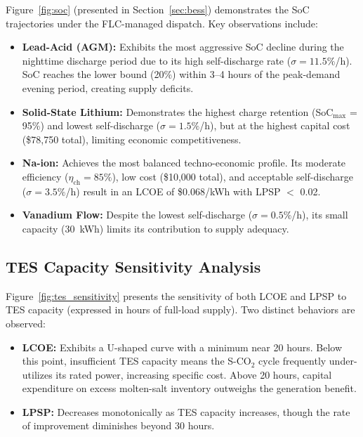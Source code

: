 \documentclass[journal]{IEEEtran}
\begin{document}
Figure~\ref{fig:soc} (presented in Section~\ref{sec:bess}) demonstrates the SoC trajectories under the FLC-managed dispatch. Key observations include:

\begin{itemize}
    \item \textbf{Lead-Acid (AGM):} Exhibits the most aggressive SoC decline during the nighttime discharge period due to its high self-discharge rate ($\sigma = 11.5\%$/h). SoC reaches the lower bound (20\%) within 3--4 hours of the peak-demand evening period, creating supply deficits.
    \item \textbf{Solid-State Lithium:} Demonstrates the highest charge retention (SoC$_{\max}$ = 95\%) and lowest self-discharge ($\sigma = 1.5\%$/h), but at the highest capital cost (\$78,750 total), limiting economic competitiveness.
    \item \textbf{Na-ion:} Achieves the most balanced techno-economic profile. Its moderate efficiency ($\eta_{\text{ch}} = 85\%$), low cost (\$10,000 total), and acceptable self-discharge ($\sigma = 3.5\%$/h) result in an LCOE of \$0.068/kWh with LPSP $<$ 0.02.
    \item \textbf{Vanadium Flow:} Despite the lowest self-discharge ($\sigma = 0.5\%$/h), its small capacity (30~kWh) limits its contribution to supply adequacy.
\end{itemize}

\subsection{TES Capacity Sensitivity Analysis}

Figure~\ref{fig:tes_sensitivity} presents the sensitivity of both LCOE and LPSP to TES capacity (expressed in hours of full-load supply). Two distinct behaviors are observed:

\begin{itemize}
    \item \textbf{LCOE:} Exhibits a U-shaped curve with a minimum near 20 hours. Below this point, insufficient TES capacity means the S-CO$_2$ cycle frequently under-utilizes its rated power, increasing specific cost. Above 20 hours, capital expenditure on excess molten-salt inventory outweighs the generation benefit.
    \item \textbf{LPSP:} Decreases monotonically as TES capacity increases, though the rate of improvement diminishes beyond 30 hours.
\end{itemize}
\end{document}
